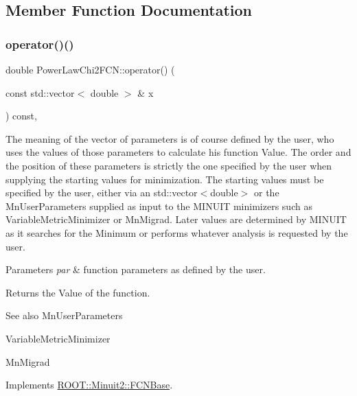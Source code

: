 \subsection{Member Function Documentation}
\mbox{\label{classPowerLawChi2FCN_a60b7b03daefc8250dcaaa2d4937f4bfc}} 
\subsubsection{\texorpdfstring{operator()()}{operator()()}\hspace{0.1cm}{\footnotesize\ttfamily [1/2]}}
{\footnotesize\ttfamily double Power\+Law\+Chi2\+F\+C\+N\+::operator() (\begin{DoxyParamCaption}\item[{const std\+::vector$<$ double $>$ \&}]{x }\end{DoxyParamCaption}) const\hspace{0.3cm}{\ttfamily [inline]}, {\ttfamily [virtual]}}

The meaning of the vector of parameters is of course defined by the user, who uses the values of those parameters to calculate his function Value. The order and the position of these parameters is strictly the one specified by the user when supplying the starting values for minimization. The starting values must be specified by the user, either via an std\+::vector$<$double$>$ or the Mn\+User\+Parameters supplied as input to the M\+I\+N\+U\+IT minimizers such as Variable\+Metric\+Minimizer or Mn\+Migrad. Later values are determined by M\+I\+N\+U\+IT as it searches for the Minimum or performs whatever analysis is requested by the user.


\begin{DoxyParams}{Parameters}
{\em par} & function parameters as defined by the user.\\
\hline
\end{DoxyParams}
\begin{DoxyReturn}{Returns}
the Value of the function.
\end{DoxyReturn}
\begin{DoxySeeAlso}{See also}
Mn\+User\+Parameters 

Variable\+Metric\+Minimizer 

Mn\+Migrad 
\end{DoxySeeAlso}


Implements \mbox{\hyperlink{classROOT_1_1Minuit2_1_1FCNBase_ae4a86bd94d0d0f5ca6fc8f8ab2bb43cd}{R\+O\+O\+T\+::\+Minuit2\+::\+F\+C\+N\+Base}}.

